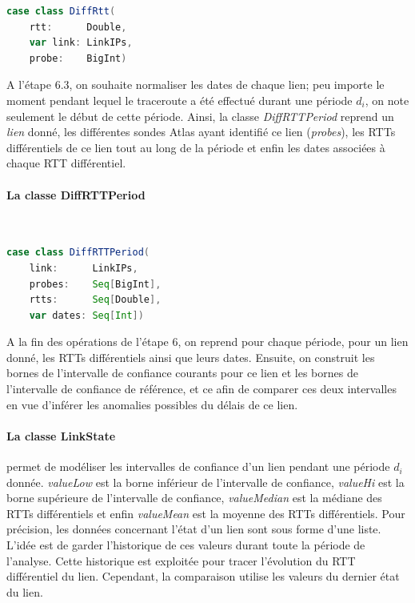 \begin{lstlisting}[language=scala, caption={La classe DiffRtt en Scala }]
case class DiffRtt(
	rtt:      Double,
	var link: LinkIPs,
	probe:    BigInt)
\end{lstlisting}

A l'étape 6.3, on souhaite normaliser les dates de chaque lien; peu importe le moment pendant lequel le traceroute a été effectué durant une période $d_i$, on note seulement le début de cette période. Ainsi,  la classe  \textit{DiffRTTPeriod}  reprend un \textit{lien} donné, les différentes sondes Atlas ayant identifié ce lien (\textit{probes}), les RTTs différentiels de ce lien tout au long de la période et enfin les dates associées à chaque RTT différentiel.
\paragraph{La classe DiffRTTPeriod } ~
\begin{lstlisting}[language=scala, caption={La classe DiffRTTPeriod en Scala }]
case class DiffRTTPeriod(
	link:      LinkIPs,
	probes:    Seq[BigInt],
	rtts:      Seq[Double],
	var dates: Seq[Int])
\end{lstlisting}

A la fin des opérations de l'étape 6, on reprend pour chaque période, pour un lien donné, les RTTs différentiels ainsi que leurs dates. Ensuite, on construit les bornes de l'intervalle de confiance courants pour ce lien et les bornes de l'intervalle de confiance de référence, et ce afin de comparer ces deux intervalles en vue d'inférer les anomalies possibles du délais de ce lien.


\paragraph{La classe LinkState } permet de modéliser les intervalles de confiance d'un lien pendant une période $d_i$ donnée. \textit{valueLow} est la borne inférieur de l'intervalle de confiance, \textit{valueHi} est la borne supérieure de l'intervalle de confiance, \textit{valueMedian} est la médiane des RTTs différentiels et enfin \textit{valueMean} est la moyenne des RTTs différentiels. Pour précision, les données concernant l'état d'un lien sont sous forme d'une liste. L'idée est de garder l'historique de ces valeurs durant toute la période de l'analyse. Cette historique est exploitée pour tracer l'évolution du RTT différentiel du lien. Cependant, la comparaison utilise les valeurs du dernier état du lien.

